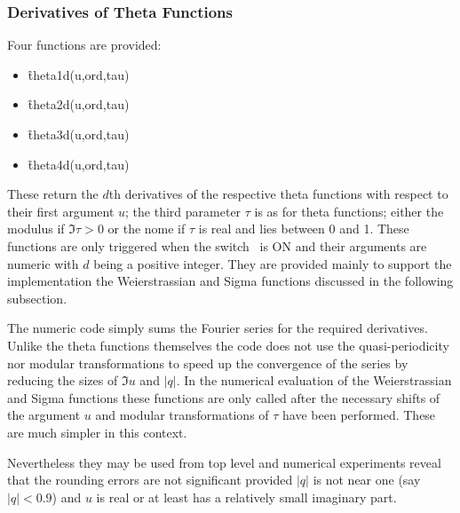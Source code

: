 \subsubsection{Derivatives of Theta Functions}

\hypertarget{THETAD}{}
\hypertarget{operator:THETA1D}{}
\hypertarget{operator:THETA2D}{}
\hypertarget{operator:THETA3D}{}
\hypertarget{operator:THETA4D}{}
 
Four functions are provided:
\begin{itemize}
\item \f{theta1d(u,ord,tau)}
\item \f{theta2d(u,ord,tau)}
\item \f{theta3d(u,ord,tau)}
\item \f{theta4d(u,ord,tau)}
\end{itemize}
These return the $d$th derivatives of the respective theta functions
with respect to their first argument $u$; the third parameter $\tau$ is as
for theta functions; either the modulus if $\Im\tau >0$ or the nome if $\tau$
is real and lies between 0 and 1.
These functions are only triggered when the switch
\ is ON and their arguments are numeric with
$d$ being a positive integer.  They are provided mainly to support the
implementation the Weierstrassian and Sigma functions discussed in the
following subsection.

The numeric code simply sums the Fourier series for the required derivatives.
Unlike the theta functions themselves the code does not use the quasi-periodicity nor
modular transformations to speed  up the convergence of the series by reducing the sizes
of $\Im u$ and $|q|$.  In the numerical evaluation of the Weierstrassian and Sigma functions
these functions are only called after the necessary shifts of the argument $u$ and modular
transformations of $\tau$ have been performed. These are much simpler in this context.

Nevertheless they may be used from top level and numerical experiments reveal that the rounding
errors are not significant provided $|q|$ is not near one (say $|q|<0.9$)
and $u$ is real or at least has a relatively small imaginary part.

